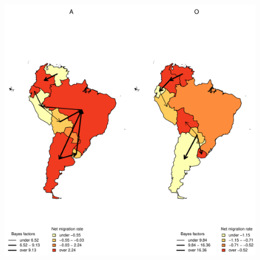 \documentclass[10pt]{article}
\begin{document}
\begin{figure}[H]
\begin{center}
\includegraphics[scale=.90]{FIGURES/MJandBFs.pdf}
\end{center}
\caption{}
\label{fig:mj&BFs}
\end{figure}
\newpage
\end{document}
